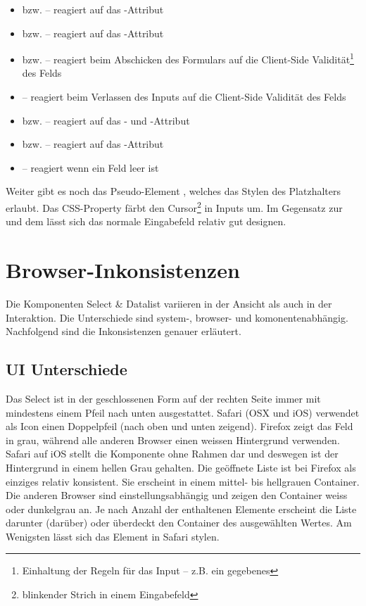 \begin{itemize}
    \item {} bzw.  – reagiert auf das -Attribut
    \item {} bzw.  – reagiert auf das -Attribut
    \item {} bzw.  – reagiert beim Abschicken des Formulars auf die Client-Side Validität\footnote{
            Einhaltung der Regeln für das Input – z.B. ein gegebenes 
        } des Felds
    \item {} – reagiert beim Verlassen des Inputs auf die Client-Side Validität des Felds
    \item {} bzw.  – reagiert auf das - und -Attribut
    \item {} bzw.  – reagiert auf das -Attribut
    \item {} – reagiert wenn ein Feld leer ist
\end{itemize}

Weiter gibt es noch das Pseudo-Element , welches das Stylen des Platzhalters erlaubt.
Das CSS-Property  färbt den Cursor\footnote{
    blinkender Strich in einem Eingabefeld
} in Inputs um.
Im Gegensatz zur  und dem  lässt sich das normale Eingabefeld relativ gut designen. 


\clearpage
\section{Browser-Inkonsistenzen}
\label{sec:browserInconsistency}

Die Komponenten Select \& Datalist variieren in der Ansicht als auch in der Interaktion. 
Die Unterschiede sind system-, browser- und komonentenabhängig. 
Nachfolgend sind die Inkonsistenzen genauer erläutert. 


\subsection{UI Unterschiede}
\label{sec:uiDifferences}

Das Select ist in der geschlossenen Form auf der rechten Seite immer mit mindestens einem Pfeil nach unten ausgestattet.
Safari (OSX und iOS) verwendet als Icon einen Doppelpfeil (nach oben und unten zeigend).
Firefox zeigt das Feld in grau, während alle anderen Browser einen weissen Hintergrund verwenden.
Safari auf iOS stellt die Komponente ohne Rahmen dar und deswegen ist der Hintergrund in einem hellen Grau gehalten.
Die geöffnete Liste ist bei Firefox als einziges relativ konsistent. 
Sie erscheint in einem mittel- bis hellgrauen Container.
Die anderen Browser sind einstellungsabhängig und zeigen den Container weiss oder dunkelgrau an.
Je nach Anzahl der enthaltenen Elemente erscheint die Liste darunter (darüber) oder überdeckt den Container des ausgewählten Wertes.
Am Wenigsten lässt sich das Element in Safari stylen.

